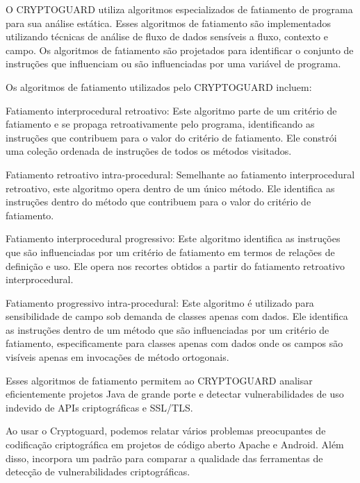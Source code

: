 

O CRYPTOGUARD utiliza algoritmos especializados de fatiamento de programa para sua análise estática. Esses algoritmos de fatiamento são implementados utilizando técnicas de análise de fluxo de dados sensíveis a fluxo, contexto e campo. Os algoritmos de fatiamento são projetados para identificar o conjunto de instruções que influenciam ou são influenciadas por uma variável de programa.

Os algoritmos de fatiamento utilizados pelo CRYPTOGUARD incluem:

Fatiamento interprocedural retroativo: Este algoritmo parte de um critério de fatiamento e se propaga retroativamente pelo programa, identificando as instruções que contribuem para o valor do critério de fatiamento. Ele constrói uma coleção ordenada de instruções de todos os métodos visitados.

Fatiamento retroativo intra-procedural: Semelhante ao fatiamento interprocedural retroativo, este algoritmo opera dentro de um único método. Ele identifica as instruções dentro do método que contribuem para o valor do critério de fatiamento.

Fatiamento interprocedural progressivo: Este algoritmo identifica as instruções que são influenciadas por um critério de fatiamento em termos de relações de definição e uso. Ele opera nos recortes obtidos a partir do fatiamento retroativo interprocedural.

Fatiamento progressivo intra-procedural: Este algoritmo é utilizado para sensibilidade de campo sob demanda de classes apenas com dados. Ele identifica as instruções dentro de um método que são influenciadas por um critério de fatiamento, especificamente para classes apenas com dados onde os campos são visíveis apenas em invocações de método ortogonais.

Esses algoritmos de fatiamento permitem ao CRYPTOGUARD analisar eficientemente projetos Java de grande porte e detectar vulnerabilidades de uso indevido de APIs criptográficas e SSL/TLS.

Ao usar o Cryptoguard, podemos relatar vários problemas preocupantes de codificação criptográfica em projetos de código aberto Apache e Android. Além disso, incorpora um padrão para comparar a qualidade das ferramentas de detecção de vulnerabilidades criptográficas.


